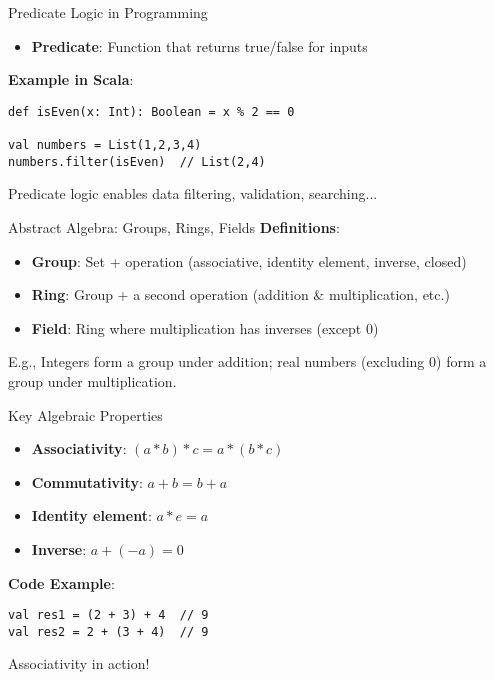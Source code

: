 \documentclass{beamer}
\begin{document}
\begin{frame}{Predicate Logic in Programming}
\begin{itemize}
    \item \textbf{Predicate}: Function that returns true/false for inputs
\end{itemize}

\textbf{Example in Scala}:
\begin{lstlisting}
def isEven(x: Int): Boolean = x % 2 == 0

val numbers = List(1,2,3,4)
numbers.filter(isEven)  // List(2,4)
\end{lstlisting}

Predicate logic enables data filtering, validation, searching...
\end{frame}

\begin{frame}{Abstract Algebra: Groups, Rings, Fields}
\textbf{Definitions}:
\begin{itemize}
    \item \textbf{Group}: Set + operation (associative, identity element, inverse, closed)
    \item \textbf{Ring}: Group + a second operation (addition \& multiplication, etc.)
    \item \textbf{Field}: Ring where multiplication has inverses (except 0)
\end{itemize}

E.g., Integers form a group under addition; real numbers (excluding 0) form a group under multiplication.
\end{frame}

\begin{frame}{Key Algebraic Properties}
\begin{itemize}
    \item \textbf{Associativity}: $(a * b) * c = a * (b * c)$
    \item \textbf{Commutativity}: $a + b = b + a$
    \item \textbf{Identity element}: $a * e = a$
    \item \textbf{Inverse}: $a + (-a) = 0$
\end{itemize}

\textbf{Code Example}:
\begin{lstlisting}
val res1 = (2 + 3) + 4  // 9
val res2 = 2 + (3 + 4)  // 9
\end{lstlisting}

Associativity in action!
\end{frame}
\end{document}
